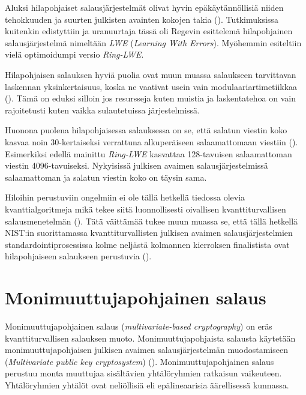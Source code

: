 Aluksi hilapohjaiset salausjärjestelmät olivat hyvin epäkäytännöllisiä niiden tehokkuuden ja suurten julkisten avainten kokojen takia (\cite{8275352}). Tutkimuksissa kuitenkin edistyttiin ja uranuurtaja tässä oli Regevin esittelemä hilapohjainen salausjärjestelmä nimeltään \emph{LWE} (\emph{Learning With Errors}). Myöhemmin esiteltiin vielä optimoidumpi versio \emph{Ring-LWE}.

Hilapohjaisen salauksen hyviä puolia ovat muun muassa salaukseen tarvittavan laskennan yksinkertaisuus, koska ne vaativat usein vain modulaariartimetiikkaa (\cite{regev2006lattice}). Tämä on eduksi silloin jos resursseja kuten muistia ja laskentatehoa on vain rajoitetusti kuten vaikka sulautetuissa järjestelmissä.

Huonona puolena hilapohjaisessa salauksessa on se, että salatun viestin koko kasvaa noin 30-kertaiseksi verrattuna alkuperäiseen salaamattomaan viestiin (\cite{8275352}). Esimerkiksi edellä mainittu \emph{Ring-LWE} kasvattaa 128-tavuisen salaamattoman viestin 4096-tavuiseksi. Nykyisissä julkisen avaimen salausjärjestelmissä salaamattoman ja salatun viestin koko on täysin sama.

Hiloihin perustuviin ongelmiin ei ole tällä hetkellä tiedossa olevia kvanttialgoritmeja mikä tekee siitä luonnollisesti oivallisen kvanttiturvallisen salausmenetelmän (\cite{regev2006lattice}). Tätä väittämää tukee muun muassa se, että tällä hetkellä NIST:in suorittamassa kvanttiturvallisten julkisen avaimen salausjärjestelmien standardointiprosessissa kolme neljästä kolmannen kierroksen finalistista ovat hilapohjaiseen salaukseen perustuvia (\cite{alagic2020status}).

\section{Monimuuttujapohjainen salaus}
Monimuuttujapohjainen salaus (\emph{multivariate-based cryptography}) on eräs kvanttiturvallisen salauksen muoto. Monimuuttujapohjaista salausta käytetään monimuuttujapohjaisen julkisen avaimen salausjärjestelmän muodostamiseen (\emph{Multivariate public key cryptosystem}) (\cite{Ding2009}). Monimuuttujapohjainen salaus perustuu monta muuttujaa sisältävien yhtälöryhmien ratkaisun vaikeuteen. Yhtälöryhmien yhtälöt ovat neliöllisiä eli epälineaarisia äärellisessä kunnassa.

